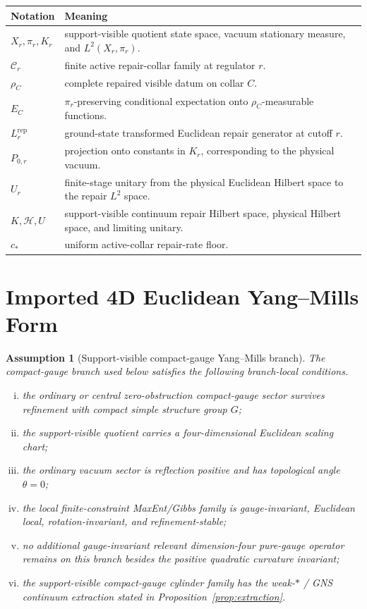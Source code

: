 \documentclass[11pt]{article}
\numberwithin{equation}{section}
\newtheorem{assumption}[theorem]{Assumption}
\theoremstyle{remark}
\newcommand{\Rep}{\mathrm{rep}}
\newcommand{\Hcal}{\mathcal H}
\begin{document}
\begin{longtable}{@{}L{0.24\textwidth}L{0.68\textwidth}@{}}
\toprule
Notation & Meaning \\
\midrule
\endhead
\(X_r,\pi_r,K_r\) & support-visible quotient state space, vacuum stationary measure, and \(L^2(X_r,\pi_r)\). \\
\(\mathcal C_r\) & finite active repair-collar family at regulator \(r\). \\
\(\rho_C\) & complete repaired visible datum on collar \(C\). \\
\(E_C\) & \(\pi_r\)-preserving conditional expectation onto \(\rho_C\)-measurable functions. \\
\(L_r^{\Rep}\) & ground-state transformed Euclidean repair generator at cutoff \(r\). \\
\(P_{0,r}\) & projection onto constants in \(K_r\), corresponding to the physical vacuum. \\
\(U_r\) & finite-stage unitary from the physical Euclidean Hilbert space to the repair \(L^2\) space. \\
\(K,\Hcal,U\) & support-visible continuum repair Hilbert space, physical Hilbert space, and limiting unitary. \\
\(c_*\) & uniform active-collar repair-rate floor. \\
\bottomrule
\end{longtable}

\section{Imported 4D Euclidean Yang--Mills Form}

\begin{assumption}[Support-visible compact-gauge Yang--Mills branch]
\label{ass:ym-branch}
The compact-gauge branch used below satisfies the following branch-local conditions.
\begin{enumerate}[(i)]
\item the ordinary or central zero-obstruction compact-gauge sector survives refinement with compact simple structure group \(G\);
\item the support-visible quotient carries a four-dimensional Euclidean scaling chart;
\item the ordinary vacuum sector is reflection positive and has topological angle \(\theta=0\);
\item the local finite-constraint MaxEnt/Gibbs family is gauge-invariant, Euclidean local, rotation-invariant, and refinement-stable;
\item no additional gauge-invariant relevant dimension-four pure-gauge operator remains on this branch besides the positive quadratic curvature invariant;
\item the support-visible compact-gauge cylinder family has the weak-\(*\) / GNS continuum extraction stated in Proposition~\ref{prop:extraction}.
\end{enumerate}
\end{assumption}
\end{document}
